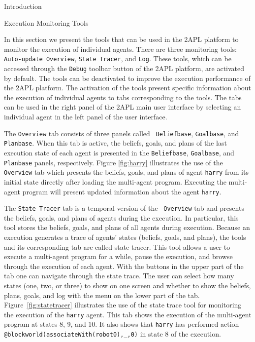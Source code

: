 \begin{chapter}{Introduction}
\begin{section}{Execution Monitoring Tools}

In this section we present the tools that can be used in the 2APL
platform to monitor the execution of individual agents. There are
three monitoring tools: {\tt Auto-update Overview}, {\tt State
Tracer}, and {\tt Log}. These tools, which can be accessed through
the {\tt Debug} toolbar button of the 2APL platform, are activated
by default. The tools can be deactivated to improve the execution
performance of the 2APL platform. The activation of the tools
present specific information about the execution of individual
agents to tabs corresponding to the tools. The tabs can be used in
the right panel of the 2APL main user interface by selecting an
individual agent in the left panel of the user interface.

The {\tt Overview} tab consists of three panels called {\tt
Beliefbase}, {\tt Goalbase}, and {\tt Planbase}. When this tab is
active, the beliefs, goals, and plans of the last execution state of
each agent is presented in the {\tt Beliefbase}, {\tt Goalbase}, and
{\tt Planbase} panels, respectively. Figure \ref{fig:harry}
illustrates the use of the {\tt Overview} tab which presents the
beliefs, goals, and plans of agent {\tt harry} from its initial
state directly after loading the multi-agent program. Executing the
multi-agent program will present updated information about the agent
{\tt harry}.

The {\tt State Tracer} tab is a temporal version of the {\tt
Overview} tab and presents the beliefs, goals, and plans of agents
during the execution. In particular, this tool stores the beliefs,
goals, and plans of all agents during execution. Because an
execution generates a trace of agents' states (beliefs, goals, and
plans), the tools and its corresponding tab are called state tracer.
This tool allows a user to execute a multi-agent program for a
while, pause the execution, and browse through the execution of each
agent. With the buttons in the upper part of the tab one can
navigate through the state trace. The user can select how many
states (one, two, or three) to show on one screen and whether to
show the beliefs, plans, goals, and log with the menu on the lower
part of the tab. Figure~\ref{fig:statetracer} illustrates the use of
the state trace tool for monitoring the execution of the {\tt harry}
agent. This tab shows the execution of the multi-agent program at
states 8, 9, and 10. It also shows that {\tt harry} has performed
action {\tt @blockworld(associateWith(robot0),\_,0)} in state 8 of
the execution.


\end{section}
\end{chapter}
